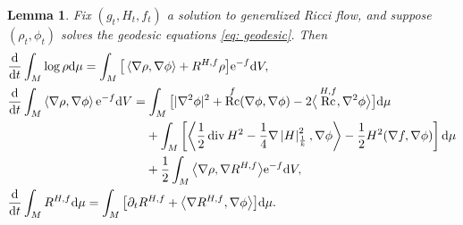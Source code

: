 \documentclass[11pt]{article}
\numberwithin{equation}{section}
\numberwithin{equation}{section}
\newtheorem{Lemma}[thm]{Lemma}
\newcommand{\del}{\partial}
\newcommand{\N}{\nabla}
\newcommand{\IP}[1]{\left<#1\right>}
\newcommand{\wnorm}[1]{\left|#1\right|^2_{\frac1k}}
\DeclareMathOperator{\Rc}{Rc}
\DeclareMathOperator{\divg}{div}
\begin{document}
\begin{Lemma}\label{lem: evolution entropy 2} Fix $(g_t, H_t, f_t)$ a solution to generalized Ricci flow, and suppose $(\rho_t,\phi_t)$ solves the geodesic equations \eqref{eq: geodesic}. Then
	\begin{align*}
	&\frac{{\rm d}}{{\rm d}t} \int_M \log\rho {\rm d}\mu= \int_M \big[\IP{\N\rho,\N\phi}+R^{H,f}\rho \big]{\rm e}^{-f} {\rm d}V,\\
	&\frac{{\rm d}}{{\rm d}t} \int_M \IP{\N\rho,\N\phi}{\rm e}^{-f} {\rm d}V=\int_M \big[|\N^2\phi|^2+\Rc^f(\N\phi,\N\phi)-2\big\langle\Rc^{H,f},\N^2\phi\big\rangle \big] {\rm d}\mu\\
	&\phantom{\frac{{\rm d}}{{\rm d}t} \int_M \IP{\N\rho,\N\phi}{\rm e}^{-f} {\rm d}V=}{} +\int_M \left[ \IP{\frac12\divg H^2 - \frac1{4}\N\wnorm{H},\N \phi} - \frac12 H^2(\N f, \N \phi) \right] {\rm d}\mu\\
	&\phantom{\frac{{\rm d}}{{\rm d}t} \int_M \IP{\N\rho,\N\phi}{\rm e}^{-f} {\rm d}V=}{} +\frac12\int_M \big\langle\N\rho,\N R^{H,f}\big\rangle{\rm e}^{-f} {\rm d}V,\\
	&\frac{{\rm d}}{{\rm d}t}\int_M R^{H,f} {\rm d}\mu
	=\int_M \big[ \del_t R^{H,f} +\big\langle\N R^{H,f},\N\phi\big\rangle \big] {\rm d}\mu.
	\end{align*}
\end{Lemma}
\end{document}
